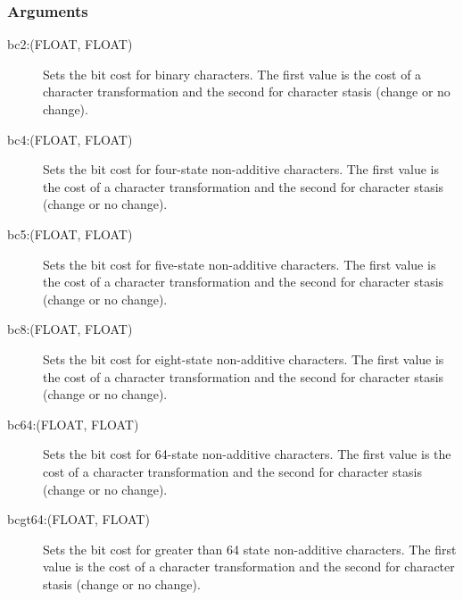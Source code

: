 	\subsubsection{Arguments}
	\begin{description}
			
		\item[bc2:(FLOAT, FLOAT)] Sets the bit cost for binary characters. The first value 
		is the cost of a character transformation and the second for character stasis 
		(change or no change).
		
		\item[bc4:(FLOAT, FLOAT)] Sets the bit cost for four-state non-additive characters. 
		The first value is the cost of a character transformation and the second for character 
		stasis (change or no change).
		
		\item[bc5:(FLOAT, FLOAT)] Sets the bit cost for five-state non-additive characters. 
		The first value is the cost of a character transformation and the second for character 
		stasis (change or no change).
		
		\item[bc8:(FLOAT, FLOAT)] Sets the bit cost for eight-state non-additive characters. 
		The first value is the cost of a character transformation and the second for character 
		stasis (change or no change).
		
		\item[bc64:(FLOAT, FLOAT)] Sets the bit cost for 64-state non-additive characters. 
		The first value is the cost of a character transformation and the second for character 
		stasis (change or no change).
		
		\item[bcgt64:(FLOAT, FLOAT)] Sets the bit cost for greater than 64 state non-additive 
		characters. The first value is the cost of a character transformation and the second for 
		character stasis (change or no change).
		


\end{description}
